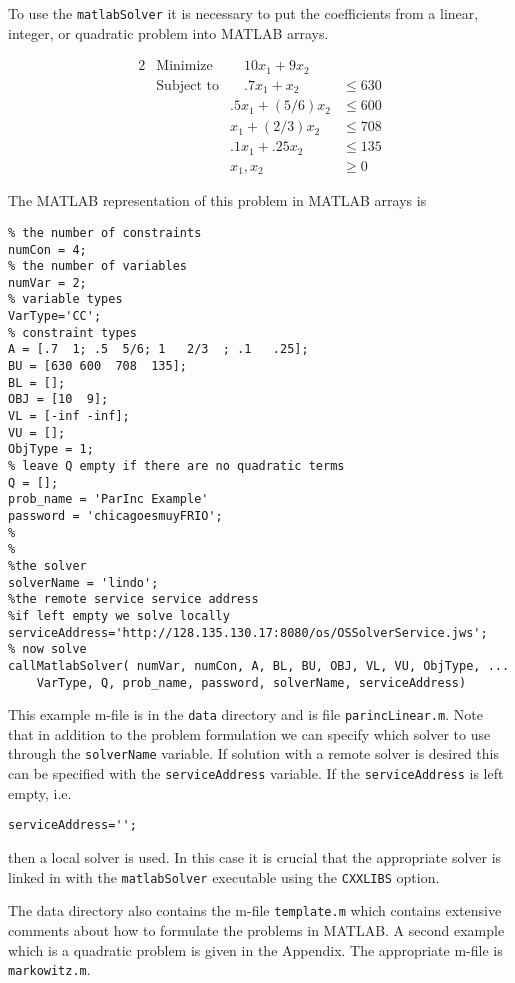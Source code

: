 \documentclass[11pt]{article}
\renewcommand{\_}{{\char"5F}}
\renewcommand{\{}{{\char"7B}}
\renewcommand{\}}{{\char"7D}}
\renewcommand{\^}{{\char"0D}}
\renewcommand{\'}{{\char"0D}}
\begin{document}
To use the {\tt matlabSolver} it is necessary to put the coefficients  from a linear, integer, or quadratic problem into MATLAB arrays. 

\begin{alignat}{2}
& \mbox{Minimize} & \quad 
10 x_{1} + 9 x_{2}\label{eq:parinobj}\\
& \mbox{Subject to} & \quad .7x_{1} + x_{2}  &\le 630  \label{eq:parinccon1}\\
& & .5x_{1} + (5/6) x_{2} &\le 600 \label{eq:parinccon2}\\
& &  x_{1} + (2/3) x_{2} &\le 708 \label{eq:parinccon3}\\
& & .1x_{1} + .25 x_{2} &\le 135 \label{eq:parinccon4}\\
& & x_{1}, x_{2} &\ge 0 \label{eq:parincnonneg}
\end{alignat}

The MATLAB representation of this problem in MATLAB arrays is
\begin{verbatim}
% the number of constraints
numCon = 4;
% the number of variables
numVar = 2;
% variable types 
VarType='CC';
% constraint types
A = [.7  1; .5  5/6; 1   2/3  ; .1   .25];
BU = [630 600  708  135];
BL = [];
OBJ = [10  9];
VL = [-inf -inf];
VU = [];
ObjType = 1;
% leave Q empty if there are no quadratic terms
Q = [];
prob_name = 'ParInc Example'
password = 'chicagoesmuyFRIO';
%
%
%the solver
solverName = 'lindo';
%the remote service service address
%if left empty we solve locally
serviceAddress='http://128.135.130.17:8080/os/OSSolverService.jws';
% now solve
callMatlabSolver( numVar, numCon, A, BL, BU, OBJ, VL, VU, ObjType, ... 
    VarType, Q, prob_name, password, solverName, serviceAddress)
\end{verbatim}
This example m-file is in the {\tt data} directory and is file {\tt parincLinear.m}. Note that in addition to the problem formulation we can specify which solver to use through the {\tt solverName} variable.  If solution with a remote solver is desired this can be specified with the {\tt serviceAddress} variable.  If the {\tt serviceAddress} is left empty, i.e.
\begin{verbatim}
serviceAddress='';
\end{verbatim}
then a local solver is used. In this case  it is crucial that the appropriate solver is linked in with the {\tt matlabSolver} executable using the {\tt CXXLIBS} option. 


The data directory  also contains the m-file  {\tt template.m} which contains extensive comments about how to formulate the problems in MATLAB.  A second example which is a quadratic problem is given in the Appendix. The appropriate m-file is {\tt markowitz.m}.
\end{document}
